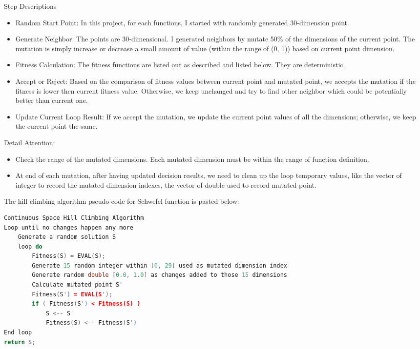 \documentclass{article}
\begin{document}
\begin{CJK}{UTF8}{gbsn}
\begin{description}
\item Step Descriptions
  \begin{itemize}
    \itemsep=-3pt
  \item Random Start Point: In this project, for each functions, I started with randomly generated 30-dimension point. 
  \item Generate Neighbor: The points are 30-dimensional. I generated neighbors by mutate 50\% of the dimensions of the current point. The mutation is simply increase or decrease a small amount of value (within the range of (0, 1)) based on current point dimension. 
  \item Fitness Calculation: The fitness functions are listed out as described and listed below. They are deterministic. 
  \item Accept or Reject: Based on the comparison of fitness values between current point and mutated point, we accepts the mutation if the fitness is lower then current fitness value. Otherwise, we keep unchanged and try to find other neighbor which could be potentially better than current one. 
  \item Update Current Loop Result: If we accept the mutation, we update the current point values of all the dimensions; otherwise, we keep the current point the same.
  \end{itemize}

\item Detail Attention: 
  \begin{itemize}
    \itemsep=-3pt
  \item Check the range of the mutated dimensions. Each mutated dimension must be within the range of function definition. 
  \item At end of each mutation, after having updated decision results, we need to clean up the loop temporary values, like the vector of integer to record the mutated dimension indexes, the vector of double used to record mutated point. 
  \end{itemize}
\end{description}

The hill climbing algorithm pseudo-code for Schwefel function is pasted below: 
\begin{lstlisting}[language=c++]
Continuous Space Hill Climbing Algorithm
Loop until no changes happen any more
    Generate a random solution S
    loop do
        Fitness(S) = EVAL(S);
        Generate 15 random integer within [0, 29] used as mutated dimension index
        Generate random double [0.0, 1.0] as changes added to those 15 dimensions
        Calculate mutated point S'
        Fitness(S') = EVAL(S');
        if ( Fitness(S') < Fitness(S) )
            S <-- S'
            Fitness(S) <-- Fitness(S')
End loop
return S;
\end{lstlisting}


\end{CJK}
\end{document}
